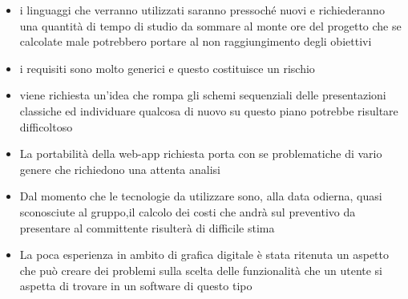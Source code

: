 \begin{itemize}
	\item i linguaggi che verranno utilizzati saranno pressoché nuovi e richiederanno una quantità di tempo di studio da sommare al monte ore del progetto che se calcolate male potrebbero portare al non raggiungimento degli obiettivi
	\item i requisiti sono molto generici e questo costituisce un rischio
	\item viene richiesta un’idea che rompa gli schemi sequenziali delle presentazioni classiche ed individuare qualcosa di nuovo su questo piano potrebbe risultare difficoltoso
	\item La portabilità della web-app richiesta porta con se problematiche di vario genere che richiedono una attenta analisi
	\item Dal momento che le tecnologie da utilizzare sono, alla data odierna, quasi sconosciute al gruppo,il calcolo dei costi che andrà sul preventivo da presentare al committente risulterà di difficile stima
	\item La poca esperienza in ambito di grafica digitale è stata ritenuta un aspetto che può creare dei problemi sulla scelta delle funzionalità che un utente si aspetta di trovare in un software di questo tipo
\end{itemize}
